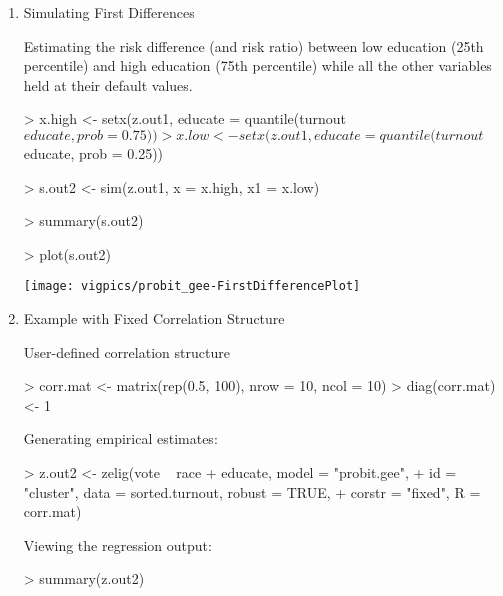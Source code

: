 \begin{enumerate}
\item {Simulating First Differences}

Estimating the risk difference (and risk ratio) between low education
(25th percentile) and high education (75th percentile) while all the
other variables held at their default values.

\begin{Schunk}
\begin{Sinput}
> x.high <- setx(z.out1, educate = quantile(turnout$educate, prob = 0.75))
> x.low <- setx(z.out1, educate = quantile(turnout$educate, prob = 0.25))
\end{Sinput}
\end{Schunk}

\begin{Schunk}
\begin{Sinput}
> s.out2 <- sim(z.out1, x = x.high, x1 = x.low)
\end{Sinput}
\end{Schunk}
\begin{Schunk}
\begin{Sinput}
> summary(s.out2)
\end{Sinput}
\end{Schunk}
\begin{center}
\begin{Schunk}
\begin{Sinput}
> plot(s.out2)
\end{Sinput}
\end{Schunk}
\texttt{[image: vigpics/probit\_gee-FirstDifferencePlot]}
\end{center}


\item  Example with Fixed Correlation Structure

User-defined correlation structure
\begin{Schunk}
\begin{Sinput}
> corr.mat <- matrix(rep(0.5, 100), nrow = 10, ncol = 10)
> diag(corr.mat) <- 1
\end{Sinput}
\end{Schunk}
Generating empirical estimates:
\begin{Schunk}
\begin{Sinput}
> z.out2 <- zelig(vote ~ race + educate, model = "probit.gee", 
+     id = "cluster", data = sorted.turnout, robust = TRUE, 
+     corstr = "fixed", R = corr.mat)
\end{Sinput}
\end{Schunk}
Viewing the regression output:
\begin{Schunk}
\begin{Sinput}
> summary(z.out2)
\end{Sinput}
\end{Schunk}
\end{enumerate}

